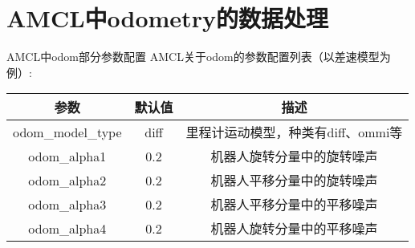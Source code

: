 \section{AMCL中odometry的数据处理}



\begin{frame}{AMCL中odom部分参数配置}
  AMCL关于odom的参数配置列表（以差速模型为例）:

  \begin{table}[htbp!]
    \centering
    \begin{tabular}{c|c|c}
      \toprule[1pt]
      参数	& 默认值 & 描述  \\
      \toprule[1pt]
      odom\_model\_type	& diff & 里程计运动模型，种类有diff、ommi等 \\
 	    \hline
      odom\_alpha1	&  0.2 & 机器人旋转分量中的旋转噪声 \\
      \hline
      odom\_alpha2	&  0.2 & 机器人平移分量中的旋转噪声 \\
      \hline
      odom\_alpha3	&  0.2 & 机器人平移分量中的平移噪声 \\
      \hline
      odom\_alpha4	&  0.2 & 机器人旋转分量中的平移噪声 \\
 	    \bottomrule[1pt]
    \end{tabular}
  \end{table}
\end{frame}





